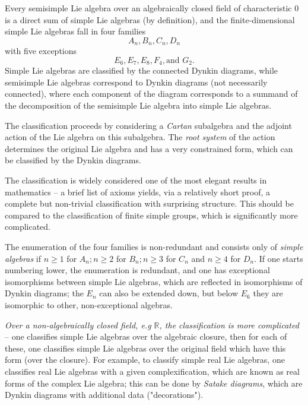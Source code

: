 \documentclass[aps,preprint]{revtex4}%
\begin{document}
Every semisimple Lie algebra over an algebraically closed field of
characteristic $0$ is a direct sum of simple Lie algebras (by definition), and
the finite-dimensional simple Lie algebras fall in four families
\begin{equation}
A_{n},B_{n},C_{n},D_{n}%
\end{equation}
with five exceptions
\begin{equation}
E_{6},E_{7},E_{8},F_{4},\text{and }G_{2}.
\end{equation}
Simple Lie algebras are classified by the connected Dynkin diagrams, while
semisimple Lie algebras correspond to Dynkin diagrams (not necessarily
connected), where each component of the diagram corresponds to a summand of
the decomposition of the semisimple Lie algebra into simple Lie algebras.

The classification proceeds by considering a \emph{Cartan} subalgebra and the
adjoint action of the Lie algebra on this subalgebra. The \emph{root system}
of the action determines the original Lie algebra and has a very constrained
form, which can be classified by the Dynkin diagrams.

The classification is widely considered one of the most elegant results in
mathematics -- a brief list of axioms yields, via a relatively short proof, a
complete but non-trivial classification with surprising structure. This should
be compared to the classification of finite simple groups, which is
significantly more complicated.

The enumeration of the four families is non-redundant and consists only of
\emph{simple algebras} if $n\geq1$ for $A_{n};n\geq2$ for $B_{n};n\geq3$ for
$C_{n}$ and $n\geq4$ for $D_{n}$. If one starts numbering lower, the
enumeration is redundant, and one has exceptional isomorphisms between simple
Lie algebras, which are reflected in isomorphisms of Dynkin diagrams; the
$E_{n}$ can also be extended down, but below $E_{6}$ they are isomorphic to
other, non-exceptional algebras.

\emph{Over a non-algebraically closed field, e.g $\mathbb{R}$, the
classification is more complicated} -- one classifies simple Lie algebras over
the algebraic closure, then for each of these, one classifies simple Lie
algebras over the original field which have this form (over the closure). For
example, to classify simple real Lie algebras, one classifies real Lie
algebras with a given complexification, which are known as real forms of the
complex Lie algebra; this can be done by \emph{Satake diagrams}, which are
Dynkin diagrams with additional data ("decorations").
\end{document}
